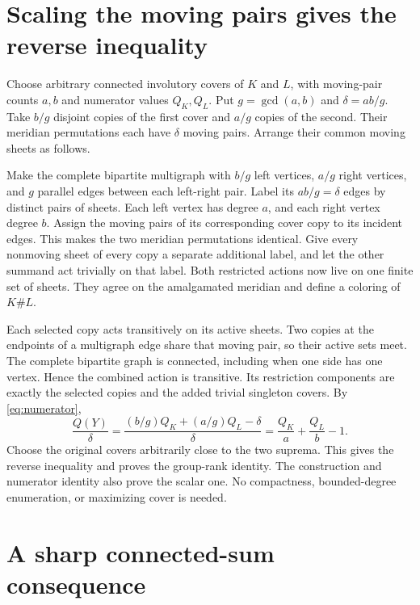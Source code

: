 \documentclass[11pt]{article}
\begin{document}
\section{Scaling the moving pairs gives the reverse inequality}

Choose arbitrary connected involutory covers of $K$ and $L$, with
moving-pair counts $a,b$ and numerator values $Q_K,Q_L$.
Put $g=\gcd(a,b)$ and $\delta=ab/g$.
Take $b/g$ disjoint copies of the first cover and $a/g$ copies of
the second. Their meridian permutations each have $\delta$ moving
pairs. Arrange their common moving sheets as follows.

Make the complete bipartite multigraph with $b/g$ left vertices,
$a/g$ right vertices, and $g$ parallel edges between each left-right
pair. Label its $ab/g=\delta$ edges by distinct pairs of sheets.
Each left vertex has degree $a$, and each right vertex degree $b$.
Assign the moving pairs of its corresponding cover copy to its
incident edges. This makes the two meridian permutations identical.
Give every nonmoving sheet of every copy a separate additional
label, and let the other summand act trivially on that label.
Both restricted actions now live on one finite set of sheets.
They agree on the amalgamated meridian and define a coloring of
$K\#L$.

Each selected copy acts transitively on its active sheets. Two
copies at the endpoints of a multigraph edge share that moving
pair, so their active sets meet. The complete bipartite graph is
connected, including when one side has one vertex. Hence the
combined action is transitive. Its restriction components are
exactly the selected copies and the added trivial singleton covers.
By \eqref{eq:numerator},
\[
 \frac{Q(Y)}{\delta}
 =\frac{(b/g)Q_K+(a/g)Q_L-\delta}{\delta}
 =\frac{Q_K}{a}+\frac{Q_L}{b}-1.
\]
Choose the original covers arbitrarily close to the two suprema.
This gives the reverse inequality and proves the group-rank identity.
The construction and numerator identity also prove the scalar one.
No compactness, bounded-degree enumeration, or maximizing cover is
needed.

\section{A sharp connected-sum consequence}
\end{document}
